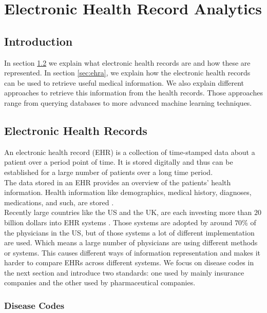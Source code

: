 \graphicspath{ {Context/Images/} }


\chapter{Electronic Health Record Analytics}
\label{cha:context}

\section{Introduction}

In section \ref{sec:ehr} we explain what electronic health records are and how these are represented. In section \ref{sec:ehra}, we explain how the electronic health records can be used to retrieve useful medical information. We also explain different approaches to retrieve this information from the health records. Those approaches range from querying databases to more advanced machine learning techniques.


\section{Electronic Health Records}
\label{sec:ehr}

An electronic health record (EHR) is a collection of time-stamped data about a patient over a period point of time. It is stored digitally and thus can be established for a large number of patients over a long time period. \\
The data stored in an EHR provides an overview of the patients' health information. Health information like demographics, medical history, diagnoses, medications, and such, are stored \cite{HealthIT:online}. \\

Recently large countries like the US and the UK, are each investing more than $20$ billion dollars into EHR systems \cite{EHRworld:article}. Those systems are adopted by around $70$\% of the physicians in the US, but of those systems a lot of different implementation are used. Which means a large number of physicians are using different methods or systems. This causes different ways of information representation and makes it harder to compare EHRs across different systems. We focus on disease codes in the next section and introduce two standards: one used by mainly insurance companies and the other used by pharmaceutical companies. 


\subsection{Disease Codes}

